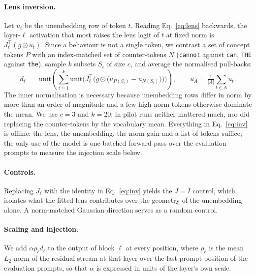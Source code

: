 \documentclass{article}
\begin{document}
\paragraph{Lens inversion.}
Let $u_t$ be the unembedding row of token $t$. Reading Eq.~\ref{eq:lens} backwards, the layer-$\ell$ activation that most raises the lens logit of $t$ at fixed norm is $J_\ell^\top (g \odot u_t)$. Since a behaviour is not a single token, we contrast a set of concept tokens $P$ with an index-matched set of counter-tokens $N$ (\texttt{cannot} against \texttt{can}, \texttt{THE} against \texttt{the}), sample $k$ subsets $S_i$ of size $c$, and average the normalised pull-backs:
\begin{equation}
  d_\ell \;=\; \mathrm{unit}\!\left(\sum_{i=1}^{k} \mathrm{unit}\Big(J_\ell^\top \Big(g \odot \big(\bar u_{P(S_i)} - \bar u_{N(S_i)}\big)\Big)\Big)\right),
  \qquad
  \bar u_A = \tfrac{1}{|A|}\!\sum_{t \in A}\!u_t .
  \label{eq:inv}
\end{equation}
The inner normalisation is necessary because unembedding rows differ in norm by more than an order of magnitude and a few high-norm tokens otherwise dominate the mean. We use $c = 3$ and $k = 20$; in pilot runs neither mattered much, nor did replacing the counter-tokens by the vocabulary mean. Everything in Eq.~\ref{eq:inv} is offline: the lens, the unembedding, the norm gain and a list of tokens suffice; the only use of the model is one batched forward pass over the evaluation prompts to measure the injection scale below.

\paragraph{Controls.}
Replacing $J_\ell$ with the identity in Eq.~\ref{eq:inv} yields the $J{=}I$ control, which isolates what the fitted lens contributes over the geometry of the unembedding alone. A norm-matched Gaussian direction serves as a random control.

\paragraph{Scaling and injection.}
We add $\alpha \rho_\ell d_\ell$ to the output of block $\ell$ at every position, where $\rho_\ell$ is the mean $L_2$ norm of the residual stream at that layer over the last prompt position of the evaluation prompts, so that $\alpha$ is expressed in units of the layer's own scale.
\end{document}
